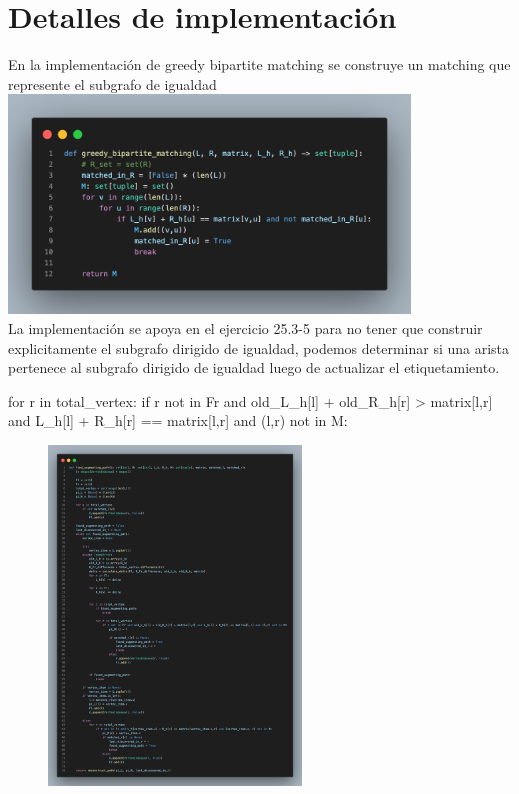 \documentclass[sn-mathphys,Numbered]{sn-jnl}%
\theoremstyle{thmstyleone}%
\theoremstyle{thmstyletwo}%
\theoremstyle{thmstylethree}%
\begin{document}
 \section*{Detalles de implementaci\'on }

 En la implementaci\'on de greedy bipartite matching se construye un matching que represente el subgrafo de igualdad
\includegraphics[width=0.8\textwidth]{1.png}
\\
La implementaci\'on se apoya en el ejercicio 25.3-5 para no tener que construir explicitamente el subgrafo dirigido de igualdad, podemos determinar si una arista pertenece al subgrafo dirigido de igualdad luego de actualizar el etiquetamiento. 
\begin{python}
for r in total_vertex:
    if r not in Fr and old_L_h[l] + old_R_h[r] > matrix[l,r] and L_h[l] + R_h[r] == matrix[l,r] and (l,r) not in M:


\end{python}
 \begin{figure}[htb]
        \centering
        \includegraphics[width=0.6\textwidth]{2.png}
        \centering
    \end{figure}
\end{document}
